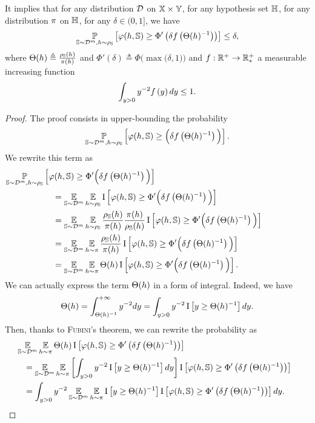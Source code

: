 \begin{noaddcontents}
\begin{lemma}
It implies that for any distribution $\D$ on $\X\times\Y$, for any hypothesis set $\H$, for any distribution $\P$ on $\H$,  for any $\delta\in(0, 1]$, we have
\begin{align*}
    \PP_{\S\sim\D^\m,\h\sim\AQ}\LB \varphi(\h,\S) \ge \Phi'\LP\delta f\LP\Theta(\h)^{-1}\RP\RP \RB \le \delta,
\end{align*}
where $\Theta(\h)\triangleq\frac{\AQ(\h)}{\P(\h)}$ and $\Phi'(\delta) \triangleq\Phi\Big(\!\max\!\Big(\delta, 1\Big)\Big)$ and $f: \Rbb^+ \to \Rbb^+_{*}$ a measurable increasing function \st 
\begin{align*}
\int_{y>0}y^{-2}f\LP y\RP dy\le 1.
\end{align*}
\end{lemma}
\begin{proof}
The proof consists in upper-bounding the probability
\begin{align*}
\PP_{\S\sim\D^\m,\h\sim\AQ}\LB \varphi(\h,\S) \ge \Big(\delta f\LP\Theta(\h)^{-1}\RP\Big) \RB.
\end{align*}
We rewrite this term as 
\begin{align*}
    &\hspace{-2cm}\PP_{\S\sim\D^\m,\h\sim\AQ}\LB \varphi(\h,\S) \ge \Phi'\Big(\delta f\LP\Theta(\h)^{-1}\RP\Big) \RB\\
    &= \EE_{\S\sim\D^\m}\EE_{\h\sim\AQ} \indic\LB \varphi(\h,\S) \ge \Phi'\Big(\delta f\LP\Theta(\h)^{-1}\RP\Big) \RB\\
    &= \EE_{\S\sim\D^\m}\EE_{\h\sim\AQ}\frac{\AQ(\h)}{\P(\h)}\frac{\P(\h)}{\AQ(\h)} \indic\LB \varphi(\h,\S) \ge \Phi'\Big(\delta f\LP\Theta(\h)^{-1}\RP\Big) \RB\\
    &= \EE_{\S\sim\D^\m}\EE_{\h\sim\P}\frac{\AQ(\h)}{\P(\h)} \indic\LB \varphi(\h,\S) \ge \Phi'\Big(\delta f\LP\Theta(\h)^{-1}\RP\Big) \RB\\
    &= \EE_{\S\sim\D^\m}\EE_{\h\sim\P}\Theta(\h) \indic\LB \varphi(\h,\S) \ge \Phi'\Big(\delta f\LP\Theta(\h)^{-1}\RP\Big) \RB.
\end{align*}
We can actually express the term $\Theta(\h)$ in a form of integral. 
Indeed, we have
\begin{align*}
    \Theta(\h) = \int_{\Theta(\h)^{-1}}^{+\infty}y^{-2}dy = \int_{y>0}y^{-2}\indic\LB y\ge \Theta(\h)^{-1} \RB dy.
\end{align*}
Then, thanks to \textsc{Fubini}'s theorem, we can rewrite the probability as
\begin{align*}
    &\hspace{-0.3cm}\EE_{\S\sim\D^\m}\EE_{\h\sim\P}\Theta(\h) \indic\LB \varphi(\h,\S) \ge \Phi'\LP\delta f\LP\Theta(\h)^{-1}\RP\RP \RB\\
    &= \EE_{\S\sim\D^\m}\EE_{\h\sim\P} \LB \int_{y>0}y^{-2}\indic\LB y\ge \Theta(\h)^{-1} \RB dy \RB \indic\LB \varphi(\h,\S) \ge \Phi'\LP\delta f\LP\Theta(\h)^{-1}\RP\RP \RB\\
    &= \int_{y>0}y^{-2}\EE_{\S\sim\D^\m}\EE_{\h\sim\P}\indic\LB y\ge \Theta(\h)^{-1}\RB \indic\LB \varphi(\h,\S) \ge \Phi'\LP\delta f\LP\Theta(\h)^{-1}\RP\RP \RB dy.
\end{align*}


\end{proof}
\end{noaddcontents}
